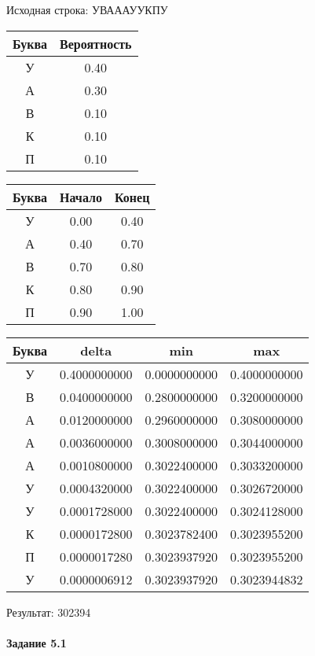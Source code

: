 \documentclass[a4paper, 12pt]{article}
\begin{document}
Исходная строка: УВАААУУКПУ\
\begin{center}
 \begin{tabular}{ |c|c| } 
  \hline
     Буква & Вероятность \\ \hline
У & 0.40\\\hline
А & 0.30\\\hline
В & 0.10\\\hline
К & 0.10\\\hline
П & 0.10
\\ \hline \end{tabular}
\end{center}
\begin{center}
 \begin{tabular}{ |c|c|c| } 
  \hline
     Буква & Начало & Конец \\ \hline
У & 0.00 & 0.40\\\hline
А & 0.40 & 0.70\\\hline
В & 0.70 & 0.80\\\hline
К & 0.80 & 0.90\\\hline
П & 0.90 & 1.00
\\ \hline \end{tabular}
\end{center}
\begin{center}
 \begin{tabular}{ |c|c|c|c| } 
  \hline
     Буква & delta & min & max \\ \hline
У & 0.4000000000 & 0.0000000000 & 0.4000000000\\\hline
В & 0.0400000000 & 0.2800000000 & 0.3200000000\\\hline
А & 0.0120000000 & 0.2960000000 & 0.3080000000\\\hline
А & 0.0036000000 & 0.3008000000 & 0.3044000000\\\hline
А & 0.0010800000 & 0.3022400000 & 0.3033200000\\\hline
У & 0.0004320000 & 0.3022400000 & 0.3026720000\\\hline
У & 0.0001728000 & 0.3022400000 & 0.3024128000\\\hline
К & 0.0000172800 & 0.3023782400 & 0.3023955200\\\hline
П & 0.0000017280 & 0.3023937920 & 0.3023955200\\\hline
У & 0.0000006912 & 0.3023937920 & 0.3023944832
\\ \hline \end{tabular}
\end{center}
Результат: 302394
\pagebreak
\paragraph{Задание 5.1 \\
}
\end{document}
